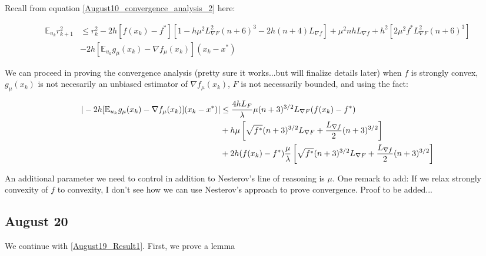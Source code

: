 \documentclass{article}
\begin{document}
Recall from equation \eqref{August10_convergence_analysis_2} here:

\begin{align*}
\mathbb{E}_{u_k}r_{k+1}^2 & \leq r_k^2 - 2h[f(x_k)-f^*][1 - h\mu^2L_{\nabla F}^2(n+6)^3 - 2h(n+4)L_{\nabla f}] + \mu^2nhL_{\nabla f} + h^2[2\mu^2f^*L_{\nabla F}^2(n+6)^3] \\ & - 2h[\mathbb{E}_{u_k}g_{\mu}(x_k)-\nabla f_{\mu}(x_k)](x_k-x^*)
\end{align*}

We can proceed in proving the convergence analysis (pretty sure it works...but will finalize details later) when $f$ is strongly convex, $g_{\mu}(x_k)$ is not necesarily an unbiased estimator of $\nabla f_{\mu}(x_k)$, $F$ is not necessarily bounded, and using the fact: 

\begin{align}
|-2h[\mathbb{E}_{u_k}g_{\mu}(x_k)-\nabla f_{\mu}(x_k)](x_k-x^*) | & \leq \frac{4hL_F}{\lambda}\mu(n+3)^{3/2}L_{\nabla F}(f(x_k) - f^*) \notag \\ & + h\mu\left[\sqrt{f^*}(n+3)^{3/2}L_{\nabla F} + \frac{L_{\nabla f}}{2}(n+3)^{3/2}\right] \notag  \\ & + 2h(f(x_k) - f^*)\frac{\mu}{\lambda}\left[\sqrt{f^*}(n+3)^{3/2}L_{\nabla F} + \frac{L_{\nabla f}}{2}(n+3)^{3/2}\right] \label{August19_Result1}
\end{align}

An additional parameter we need to control in addition to Nesterov's line of reasoning is $\mu$. One remark to add: If we relax strongly convexity of $f$ to convexity, I don't see how we can use Nesterov's approach to prove convergence.  Proof to be added... \newline 

\subsection{August 20}

We continue with \eqref{August19_Result1}. First, we prove a lemma
\end{document}
